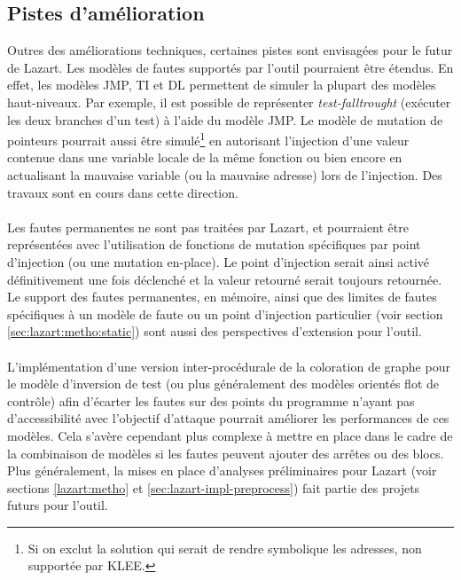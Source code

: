         \subsection{Pistes d'amélioration}
        \label{sec:future-work}
        
            Outres des améliorations techniques, certaines pistes sont envisagées pour le futur de Lazart. Les modèles de fautes supportés par l'outil pourraient être étendus. 
            En effet, les modèles \gls{JMP}, \gls{TI} et \gls{DL} permettent de simuler la plupart des modèles haut-niveaux. 
            Par exemple, il est possible de représenter \textit{test-falltrought} (exécuter les deux branches d'un test) à l'aide du modèle \gls{JMP}. 
            Le modèle de mutation de pointeurs pourrait aussi être simulé\footnote{Si on exclut la solution qui serait de rendre symbolique les adresses, non supportée par KLEE.} en autorisant l'injection d'une valeur contenue dans une variable locale de la même fonction ou bien encore en actualisant la mauvaise variable (ou la mauvaise adresse) lors de l'injection. 
            Des travaux sont en cours dans cette direction.
            
            \paragraph{}
            Les fautes permanentes ne sont pas traitées par Lazart, et pourraient être représentées avec l'utilisation de fonctions de mutation spécifiques par point d'injection (ou une mutation en-place). Le point d'injection serait ainsi activé définitivement une fois déclenché et la valeur retourné serait toujours retournée.
            Le support des fautes permanentes, en mémoire, ainsi que des limites de fautes spécifiques à un modèle de faute ou un point d'injection particulier (voir section \ref{sec:lazart:metho:static}) sont aussi des perspectives d'extension pour l'outil.
            
            
            \paragraph{}
            L'implémentation d'une version inter-procédurale de la coloration de graphe \cite{Potet/ICST14} pour le modèle d'inversion de test (ou plus généralement des modèles orientés flot de contrôle) afin d'écarter les fautes sur des points du programme n'ayant pas d'accessibilité avec l'objectif d'attaque pourrait améliorer les performances de ces modèles.
            Cela s'avère cependant plus complexe à mettre en place dans le cadre de la combinaison de modèles si les fautes peuvent ajouter des arrêtes ou des blocs. 
            Plus généralement, la mises en place d'analyses préliminaires pour Lazart (voir sections \ref{lazart:metho} et \ref{sec:lazart-impl-preprocess}) fait partie des projets futurs pour l'outil.
            
